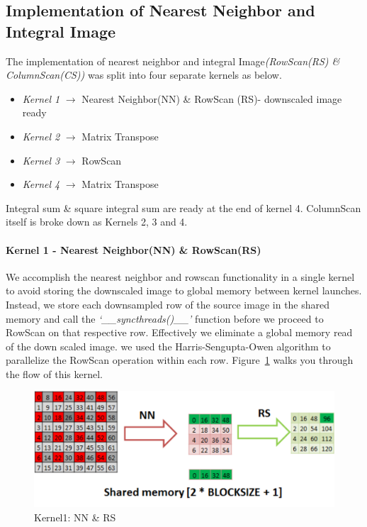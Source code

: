 \subsection{Implementation of Nearest Neighbor and Integral Image}\label{sec:impl nn II}
The implementation of nearest neighbor and integral Image\textit{(RowScan(RS) \& ColumnScan(CS)) } was 
split into four separate kernels as below.

\vspace{0.1in}
\begin{itemize}
\item \textit{Kernel 1} \begin{math}\rightarrow\end{math} Nearest Neighbor(NN) \& RowScan (RS)- downscaled image ready
\item \textit{Kernel 2} \begin{math}\rightarrow\end{math} Matrix Transpose
\item \textit{Kernel 3} \begin{math}\rightarrow\end{math} RowScan
\item \textit{Kernel 4} \begin{math}\rightarrow\end{math} Matrix Transpose
\end{itemize}

Integral sum \& square integral sum are ready at the end of kernel 4. ColumnScan itself is broke down as Kernels 2, 3 and 4. 

\paragraph{Kernel 1 - Nearest Neighbor(NN) \& RowScan(RS)}
We accomplish the nearest neighbor and rowscan functionality 
in a single kernel to avoid storing the downscaled image to 
global memory between kernel launches. Instead, we store 
each downsampled row of the source image in the shared memory 
and call the \textit{‘\_\_syncthreads()\_\_’} function before we proceed to 
RowScan on that respective row. Effectively we eliminate a global 
memory read of the down scaled image. we used the Harris-Sengupta-Owen 
algorithm to parallelize the RowScan operation within each row. 
Figure~\ref{fig:kernel1} walks you through the flow of this kernel.

\begin{figure}[h]
  \centering
  \includegraphics[width=\linewidth]{figs/kernel1_crop.pdf}
  \caption{Kernel1: NN \& RS }
  \label{fig:kernel1}
  \end{figure}

